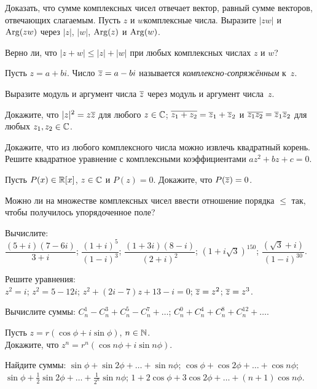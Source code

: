 \documentclass[a4paper,12pt]{article}
\begin{document}
Доказать, что сумме комплексных чисел отвечает вектор, равный сумме векторов, отвечающих слагаемым.
Пусть $z$ и $w$\т комплексные числа. Выразите $|zw|$ и $\operatorname{Arg}(zw)$ через $|z|$, $|w|$, $\operatorname{Arg}(z)$ и $\operatorname{Arg}(w)$.

Верно ли, что $|z+w|\leq|z|+|w|$ при любых комплексных числах $z$ и $w$?

Пусть $z=a+bi$. Число $\overline z=a-bi$ называется \emph{комплексно-сопряжённым} к~$z$.

Выразите модуль и аргумент числа $\overline z$ через модуль и аргумент числа~$z$.

Докажите, что
$|z|^2=z\overline z$ для любого $z\in\mathbb{C}$;
$\overline{z_1+z_2}=\overline z_1 + \overline z_2$ и $\overline{z_1z_2}=\overline z_1 \overline z_2$ для любых $z_1,z_2\in\mathbb{C}$.

 Докажите, что из любого комплексного числа можно извлечь квадратный корень.
 Решите квадратное уравнение с комплексными коэффициентами $a z^2 + b z + c = 0$.

Пусть $P(x)\in\mathbb{R}[x]$, $z\in\mathbb{C}$ и $P(z)=0$. Докажите, что $P(\overline z)=0$.

Можно ли на множестве комплексных чисел ввести отношение порядка $\le$ так, чтобы получилось упорядоченное поле?

Вычислите:\\
$\dfrac{(5+i)(7-6i)}{3+i}$;
$\dfrac{(1+i)^5}{(1-i)^3}$;
$\dfrac{(1+3i)(8-i)}{(2+i)^2}$;
$(1+i\sqrt{3})^{150}$;
$\dfrac{(\sqrt{3}+i)}{(1-i)^{30}}$.

Решите уравнения:\\
$z^2=i$;
$z^2=5-12i$;
$z^2+(2i-7)z+13-i=0$;
$\overline z=z^2$;
$\overline z=z^3$.

Вычислите суммы:
$C_{n}^{1}-C_{n}^{3}+C_{n}^{5}-C_{n}^{7}+\dots$;
$C_{n}^{0}+C_{n}^{4}+C_{n}^{8}+C_{n}^{12}+\dots$.


\newpage



Пусть $z=r(\cos\phi+i\sin\phi)$, $n\in\mathbb{N}$. \\
Докажите, что $z^n=r^n(\cos n\phi+i\sin n\phi)$.



Найдите суммы:
 $\sin \phi +\sin 2\phi +\ldots +\sin n\phi$;
 $\cos \phi +\cos 2\phi +\ldots +\cos n\phi$;\\
 $\sin \phi +\frac{1}{2}\sin 2\phi +\ldots +\frac{1}{2^n}\sin n\phi$;
 $1+2\cos \phi +3\cos 2\phi +\ldots +(n+1)\cos n\phi$.
\end{document}
